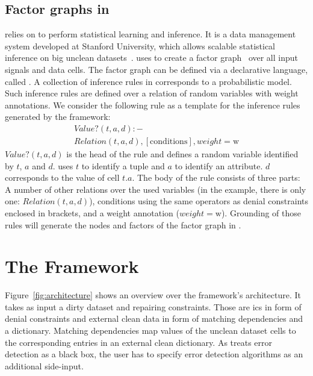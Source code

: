  \subsection{Factor graphs in \deepdive{}}
  \holoclean{} relies on \deepdive{} to perform statistical learning and inference.
  It is a data management system developed at Stanford University, which allows scalable statistical inference on big unclean datasets~\cite{deepdive}.
  \holoclean{} uses \deepdive{} to create a factor graph~\cite{pgmFactorGraph} over all input signals and data cells.
  The factor graph can be defined via a declarative language, called \ddlog{}.
  A collection of inference rules in \deepdive{} corresponds to a probabilistic model.
  Such inference rules are defined over a relation of random variables with weight annotations.
  We consider the following \ddlog{} rule as a template for the inference rules generated by the \holoclean{} framework:
  \begin{multline}
    Value?(t,a,d):-\\Relation(t,a,d), [\text{conditions}], weight=\text{w}
  \end{multline}
  $Value?(t,a,d)$ is the head of the rule and defines a random variable identified by $t$, $a$ and $d$.
  \holoclean{} uses $t$ to identify a tuple and $a$ to identify an attribute.
  $d$ corresponds to the value of cell $t.a$.
  The body of the rule consists of three parts:
  A number of other relations over the used variables (in the example, there is only one: $Relation(t,a,d)$),
  conditions using the same operators as denial constraints enclosed in brackets, and
  a weight annotation ($weight=\text{w}$).
  Grounding of those rules will generate the nodes and factors of the factor graph in \deepdive{}.
  

\section{The \holoclean{} Framework}\label{sec:framework}
  Figure~\ref{fig:architecture} shows an overview over the framework's architecture.
  It takes as input a dirty dataset and repairing constraints.
  Those are \glspl{ic} in form of denial constraints and external clean data in form of matching dependencies and a dictionary.
  Matching dependencies map values of the unclean dataset cells to the corresponding entries in an external clean dictionary.
  As \holoclean{} treats error detection as a black box, the user has to specify error detection algorithms as an additional side-input.
   
